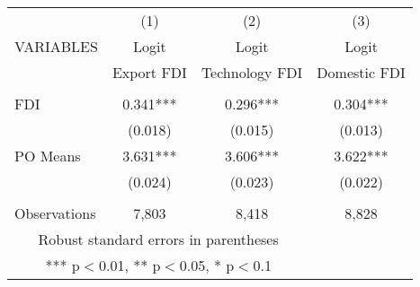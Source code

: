 \documentclass[]{article}
\begin{document}
\begin{tabular}{lccc} \hline
 & (1) & (2) & (3) \\
VARIABLES & Logit  & Logit  & Logit  \\ 
&Export FDI&Technology FDI&Domestic FDI\\ \hline
 &  &  &    \\
FDI & 0.341*** & 0.296***  &0.304***   \\
 & (0.018) & (0.015) & (0.013)   \\
PO Means &  3.631***& 3.606*** & 3.622***   \\
 &  (0.024)& (0.023) & (0.022)  \\
 &  &  &    \\
 Observations & 7,803 &  8,418& 8,828 \\ \hline
\multicolumn{3}{c}{ Robust standard errors in parentheses} \\
\multicolumn{3}{c}{ *** p$<$0.01, ** p$<$0.05, * p$<$0.1} \\
\end{tabular}
\end{document}
